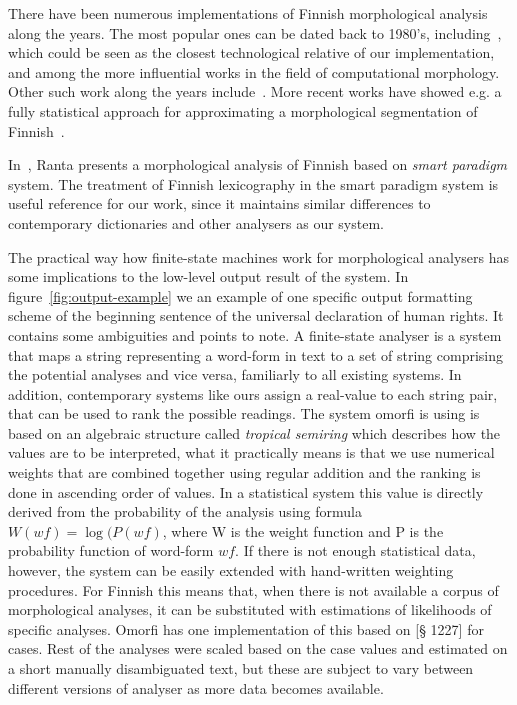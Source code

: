 \documentclass[a4paper,12pt]{article}
\begin{document}
There have been numerous implementations of Finnish morphological analysis
along the years. The most popular ones can be dated back to 1980's,
including~\cite{koskenniemi1983twolevel}, which could be seen as the closest
technological relative of our implementation, and among the more influential
works in the field of computational morphology. Other such work along the years
include~\cite{holman1988finnmorf}.  More recent works have showed e.g. a fully
statistical approach for approximating a morphological segmentation of
Finnish~\cite{creutz2005unsupervised}.

In~\cite{ranta2008predictable}, Ranta presents a morphological analysis of
Finnish based on \emph{smart paradigm} system. The treatment of Finnish
lexicography in the smart paradigm system is useful reference for our work,
since it maintains similar differences to contemporary dictionaries and other
analysers as our system. 

The practical way how finite-state machines work for morphological analysers
has some implications to the low-level output result of the system. In
figure~\ref{fig:output-example} we an example of one specific output formatting
scheme of the beginning sentence of the universal declaration of human rights.
It contains some ambiguities and points to note. A finite-state analyser is a
system that maps a string representing a word-form in text to a set of string
comprising the potential analyses and vice versa, familiarly to all existing
systems. In addition, contemporary systems like ours assign a real-value to
each string pair, that can be used to rank the possible readings.  The system
omorfi is using is based on an algebraic structure called \emph{tropical
semiring} which describes how the values are to be interpreted, what it
practically means is that we use numerical weights that are combined together
using regular addition and the ranking is done in ascending order of values.
In a statistical system this value is directly derived from the probability of
the analysis using formula $W(wf) = \log(P(wf)$, where W is the weight function
and P is the probability function of word-form $wf$. If there is not enough
statistical data, however, the system can be easily extended with hand-written
weighting procedures. For Finnish this means that, when there is not available
a corpus of morphological analyses, it can be substituted with estimations of
likelihoods of specific analyses. Omorfi has one implementation of this based
on \cite{visk}[§ 1227] for cases. Rest of the analyses were scaled based on the
case values and estimated on a short manually disambiguated text, but these are
subject to vary between different versions of analyser as more data becomes
available.
\end{document}
